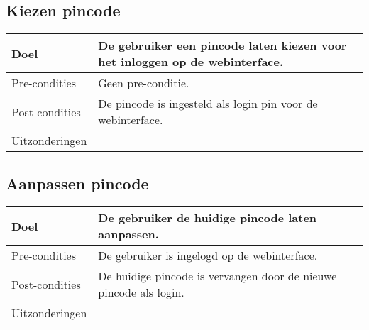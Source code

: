 \subsection{Kiezen pincode}
\begin{center}
  \begin{tabular}{ | p{4cm} | p{8.5cm} | }    \hline
    \hline
    Doel & De gebruiker een pincode laten kiezen voor het inloggen op de webinterface. \\ \hline
    Pre-condities & Geen pre-conditie. \\ \hline
    Post-condities & De pincode is ingesteld als login pin voor de webinterface. \\ \hline
    Uitzonderingen &  \\
    \hline
  \end{tabular}
\end{center}

\subsection{Aanpassen pincode}
\begin{center}
  \begin{tabular}{ | p{4cm} | p{8.5cm} | }    \hline
    Doel & De gebruiker de huidige pincode laten aanpassen. \\ \hline
    Pre-condities & De gebruiker is ingelogd op de webinterface. \\ \hline
    Post-condities & De huidige pincode is vervangen door de nieuwe pincode als login. \\ \hline
	Uitzonderingen &  \\
    \hline
  \end{tabular}
\end{center}